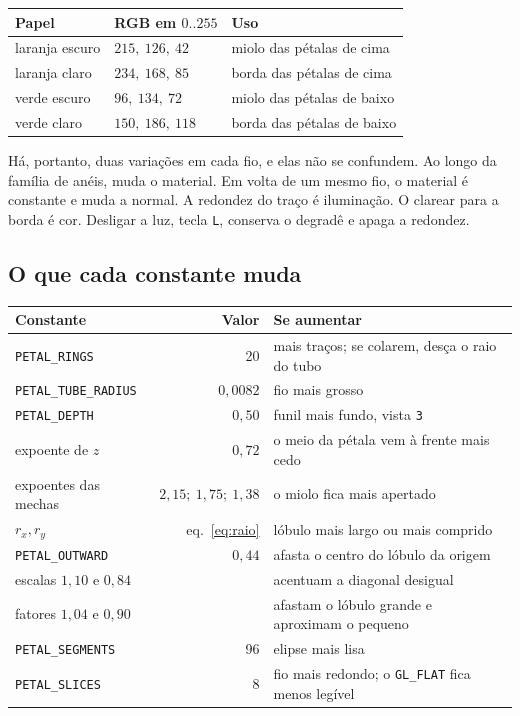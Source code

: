 \documentclass[11pt,a4paper]{article}
\newenvironment{figura}
  {\par\medskip\noindent\begin{minipage}{\linewidth}\centering}
  {\end{minipage}\par\medskip}
\newcommand{\fn}[1]{\texttt{\nobreak\hspace{0pt}#1}}
\begin{document}
\begin{center}
\small
\begin{tabular}{@{}l l l@{}}
\toprule
Papel & RGB em \(0..255\) & Uso \\
\midrule
laranja escuro & \(215,\ 126,\ 42\) & miolo das pétalas de cima \\
laranja claro & \(234,\ 168,\ 85\) & borda das pétalas de cima \\
verde escuro & \(96,\ 134,\ 72\) & miolo das pétalas de baixo \\
verde claro & \(150,\ 186,\ 118\) & borda das pétalas de baixo \\
\bottomrule
\end{tabular}
\end{center}

Há, portanto, duas variações em cada fio, e elas não se confundem. Ao longo da família de anéis, muda o material. Em volta de um mesmo fio, o material é constante e muda a normal. A redondez do traço é iluminação. O clarear para a borda é cor. Desligar a luz, tecla \fn{L}, conserva o degradê e apaga a redondez.

\subsection{O que cada constante muda}
\label{sec:constantes}

\begin{figura}
\small
\begin{tabularx}{\linewidth}{@{}l r X@{}}
\toprule
Constante & Valor & Se aumentar \\
\midrule
\fn{PETAL\_RINGS} & 20 & mais traços; se colarem, desça o raio do tubo \\
\fn{PETAL\_TUBE\_RADIUS} & \(0{,}0082\) & fio mais grosso \\
\fn{PETAL\_DEPTH} & \(0{,}50\) & funil mais fundo, vista \fn{3} \\
expoente de \(z\) & \(0{,}72\) & o meio da pétala vem à frente mais cedo \\
expoentes das mechas & \(2{,}15;\ 1{,}75;\ 1{,}38\) & o miolo fica mais apertado \\
\(r_x, r_y\) & eq.~\eqref{eq:raio} & lóbulo mais largo ou mais comprido \\
\fn{PETAL\_OUTWARD} & \(0{,}44\) & afasta o centro do lóbulo da origem \\
escalas \(1{,}10\) e \(0{,}84\) & & acentuam a diagonal desigual \\
fatores \(1{,}04\) e \(0{,}90\) & & afastam o lóbulo grande e aproximam o pequeno \\
\fn{PETAL\_SEGMENTS} & 96 & elipse mais lisa \\
\fn{PETAL\_SLICES} & 8 & fio mais redondo; o \fn{GL\_FLAT} fica menos legível \\
\bottomrule
\end{tabularx}
\end{figura}
\end{document}
